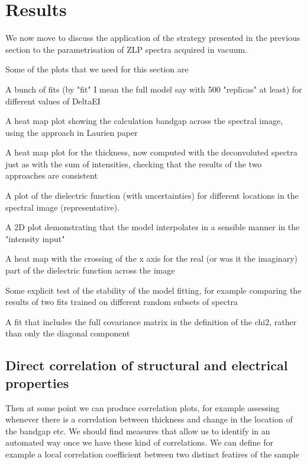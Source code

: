 \section{Results}
\label{sec:results_vacuum}

We now move to discuss the application of the strategy presented in the previous
section to the parametrisation of ZLP spectra acquired in vacuum.

Some of the plots that we need for this section are

A bunch of fits (by "fit" I mean the full model say with 500 "replicas" at least) for different values of DeltaEI

A heat map plot showing the calculation bandgap across the spectral image, using the approach in Laurien paper

A heat map plot for the thickness, now computed with the deconvoluted spectra just as with the sum of intensities, checking that the results of the two approaches are consistent

A plot of the dielectric function (with uncertainties) for different locations in the spectral image (representative).

A 2D plot demonstrating that the model interpolates in a sensible manner in the "intensity input"

A heat map with the crossing of the x axis for the real (or was it the imaginary) part of the dielectric function across the image

Some explicit test of the stability of the model fitting, for example comparing the results of two fits trained on different random subsets of spectra

A fit that includes the full covariance matrix in the definition of the chi2, rather than only the diagonal component


\subsection{Direct correlation of structural and electrical properties}

Then at some point we can produce correlation plots, for example assessing whenever there is a correlation between thickness and change in the location of the bandgap etc. We should find measures that allow us to identify
in an automated way once we have these kind of correlations.
%
We can define for example a local correlation coefficient between
two distinct featires of the sample

